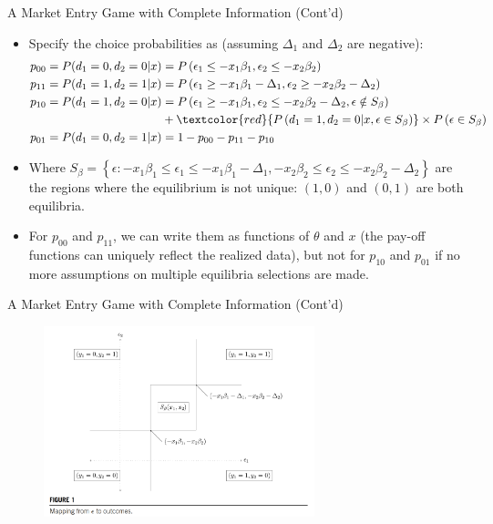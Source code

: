 \documentclass[aspectratio=169]{beamer}  %
\begin{document}
\begin{frame}{A Market Entry Game with Complete Information (Cont'd)}
\begin{itemize}
    \item Specify the choice probabilities as (assuming $\Delta_1$ and $\Delta_2$ are negative):
\begin{align*}
    p_{00} = P(d_1 = 0, d_2 = 0 | x) &= P \left(\epsilon_1 \leq -x_1 \beta_1, \epsilon_2 \leq -x_2 \beta_2\right) \\
    p_{11} = P(d_1 = 1, d_2 = 1 | x) &= P \left(\epsilon_1 \geq -x_1 \beta_1 - \Delta_1, \epsilon_2 \geq -x_2 \beta_2 - \Delta_2\right) \\
    p_{10} = P(d_1 = 1, d_2 = 0 | x) &= P \left(\epsilon_1 \geq -x_1 \beta_1, \epsilon_2 \leq -x_2 \beta_2 - \Delta_2, \epsilon \notin S_\beta \right) \\
    &+ \textcolor{red}{P \left(d_1 = 1, d_2 =0 | x, \epsilon \in S_\beta \right)} \times P\left(\epsilon \in S_\beta\right) \\
    p_{01} = P(d_1 = 0, d_2 = 1 | x) &= 1 - p_{00} - p_{11} - p_{10}
\end{align*}
\item Where $S_\beta = \left\{\epsilon: -x_1 \beta_1 \leq \epsilon_1 \leq -x_1 \beta_1 - \Delta_1, -x_2 \beta_2 \leq \epsilon_2 \leq -x_2 \beta_2 - \Delta_2\right\}$ are the regions where the equilibrium is not unique: $(1, 0)$ and $(0, 1)$ are both equilibria.
\item For $p_{00}$ and $p_{11}$, we can write them as functions of $\theta$ and $x$ (the pay-off functions can uniquely reflect the realized data), but not for $p_{10}$ and $p_{01}$ if no more assumptions on multiple equilibria selections are made.
\end{itemize}
\end{frame}

\begin{frame}{A Market Entry Game with Complete Information (Cont'd)}
\begin{figure}
    \centering
    \includegraphics[width=0.7\textwidth]{multiple equil.png}
\end{figure}
\end{frame}
\end{document}
